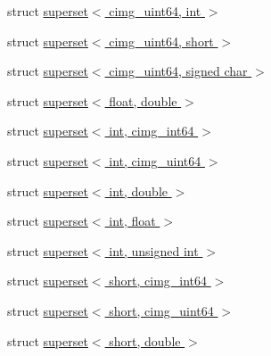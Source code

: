 \begin{DoxyCompactItemize}
\item 
struct \hyperlink{namespacecimg__library__suffixed_1_1cimg_dc/d62/structcimg__library__suffixed_1_1cimg_1_1superset_3_01cimg__uint64_00_01int_01_4}{superset$<$ cimg\+\_\+uint64, int $>$}
\item 
struct \hyperlink{namespacecimg__library__suffixed_1_1cimg_db/d13/structcimg__library__suffixed_1_1cimg_1_1superset_3_01cimg__uint64_00_01short_01_4}{superset$<$ cimg\+\_\+uint64, short $>$}
\item 
struct \hyperlink{namespacecimg__library__suffixed_1_1cimg_dc/d03/structcimg__library__suffixed_1_1cimg_1_1superset_3_01cimg__uint64_00_01signed_01char_01_4}{superset$<$ cimg\+\_\+uint64, signed char $>$}
\item 
struct \hyperlink{namespacecimg__library__suffixed_1_1cimg_d8/dbe/structcimg__library__suffixed_1_1cimg_1_1superset_3_01float_00_01double_01_4}{superset$<$ float, double $>$}
\item 
struct \hyperlink{namespacecimg__library__suffixed_1_1cimg_dc/db4/structcimg__library__suffixed_1_1cimg_1_1superset_3_01int_00_01cimg__int64_01_4}{superset$<$ int, cimg\+\_\+int64 $>$}
\item 
struct \hyperlink{namespacecimg__library__suffixed_1_1cimg_d8/d8b/structcimg__library__suffixed_1_1cimg_1_1superset_3_01int_00_01cimg__uint64_01_4}{superset$<$ int, cimg\+\_\+uint64 $>$}
\item 
struct \hyperlink{namespacecimg__library__suffixed_1_1cimg_dc/ddc/structcimg__library__suffixed_1_1cimg_1_1superset_3_01int_00_01double_01_4}{superset$<$ int, double $>$}
\item 
struct \hyperlink{namespacecimg__library__suffixed_1_1cimg_d8/d77/structcimg__library__suffixed_1_1cimg_1_1superset_3_01int_00_01float_01_4}{superset$<$ int, float $>$}
\item 
struct \hyperlink{namespacecimg__library__suffixed_1_1cimg_d4/d48/structcimg__library__suffixed_1_1cimg_1_1superset_3_01int_00_01unsigned_01int_01_4}{superset$<$ int, unsigned int $>$}
\item 
struct \hyperlink{namespacecimg__library__suffixed_1_1cimg_de/d8c/structcimg__library__suffixed_1_1cimg_1_1superset_3_01short_00_01cimg__int64_01_4}{superset$<$ short, cimg\+\_\+int64 $>$}
\item 
struct \hyperlink{namespacecimg__library__suffixed_1_1cimg_d8/d6b/structcimg__library__suffixed_1_1cimg_1_1superset_3_01short_00_01cimg__uint64_01_4}{superset$<$ short, cimg\+\_\+uint64 $>$}
\item 
struct \hyperlink{namespacecimg__library__suffixed_1_1cimg_dd/d00/structcimg__library__suffixed_1_1cimg_1_1superset_3_01short_00_01double_01_4}{superset$<$ short, double $>$}

\end{DoxyCompactItemize}
